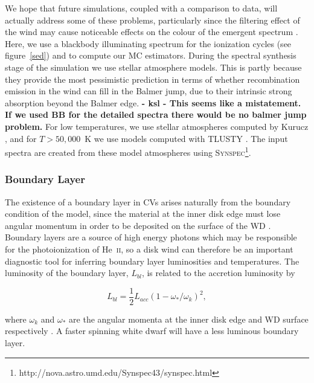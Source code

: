 \documentclass[preprint, a4paper, 11pt]{aastex}
\begin{document}
{We hope that future simulations, coupled with a comparison to data, will 
actually address some of these problems, particularly since
the filtering effect of the wind may cause noticeable effects
on the colour of the emergent spectrum \citep{hassall}. 
Here, we use a blackbody illuminating spectrum
for the ionization cycles (see figure~\ref{sed}) and to compute our MC estimators.
During the spectral synthesis stage of the simulation we use stellar atmosphere models.
This is partly because they provide the most pessimistic prediction in terms of whether recombination emission in the 
wind can fill in the Balmer jump, due to their intrinsic strong absorption beyond the Balmer edge. {\bf - ksl - This seems like a mistatement.  If we used BB for the detailed spectra there would be no balmer jump problem.}
For low temperatures, we use stellar atmospheres computed 
by Kurucz \citep{kurucz1991}, and for $T>50,000$~K we use models computed with 
\textsc{TLUSTY} \citep{tlusty}. The input spectra are created from these model
atmospheres using \textsc{Synspec}\footnote{http://nova.astro.umd.edu/Synspec43/synspec.html}.


\subsubsection{Boundary Layer}
The existence of a boundary layer in CVs arises naturally from the boundary condition
of the \cite{shakurasunyaev1973} model, since the material at the inner disk
edge must lose angular momentum in order to be deposited on
the surface of the WD \cite[see e.g.][]{lyndenbell1974}.
Boundary layers are a source of
high energy photons which may be responsible for the photoionization of 
He~\textsc{ii}, so a disk wind can therefore be an important diagnostic
tool for inferring boundary layer luminosities and temperatures. 
The luminosity of the boundary layer, $L_{bl}$, is related to the accretion luminosity
by

\begin{equation}
L_{bl} = \frac{1}{2} L_{acc} (1 - \omega_* / \omega_k)^2,
\end{equation}

where $\omega_k$ and $\omega_*$ are the angular momenta at the inner disk edge
and WD surface respectively \citep{fkrbook}. A faster spinning white dwarf 
will have a less luminous boundary layer.


}
\end{document}
